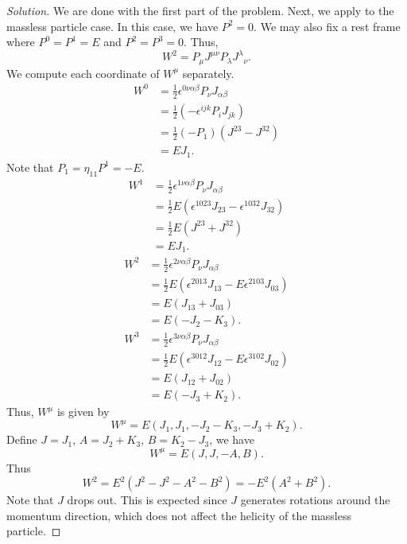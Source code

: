\begin{proof}[Solution]
	We are done with the first part of the problem. Next, we apply to the massless particle case. In this case, we have $P^2 = 0$. We may also fix a rest frame where $P^0 = P^1 = E$ and $P^2 = P^3 = 0$. Thus,
	\[
		W^2 = P_\mu J^{\mu \nu} P_\lambda {J^\lambda} _ \nu.
	\]
	We compute each coordinate of $W^\mu$ separately.
	\begin{align*}
		W^0
		&= \frac{1}{2} \epsilon^{0 \nu \alpha \beta} P_\nu J_{\alpha \beta} \\
		&= \frac{1}{2} (-\epsilon^{i j k} P_i J_{j k}) \\
		&= \frac{1}{2} (-P_1) (J^{23}- J^{32}) \\
		&= E J_1.
	\end{align*}
	Note that $P_1 = \eta_{1 1} P^1 = - E$.
	\begin{align*}
		W^1
		&= \frac{1}{2} \epsilon^{1 \nu \alpha \beta} P_\nu J_{\alpha \beta} \\
		&= \frac{1}{2} E (\epsilon^{1 0 2 3} J_{23} - \epsilon^{1 0 3 2} J_{32}) \\
		&= \frac{1}{2} E (J^{23} + J^{32}) \\
		&= E J_1.
	\end{align*}
	\begin{align*}
		W^2
		&= \frac{1}{2} \epsilon^{2 \nu \alpha \beta} P_\nu J_{\alpha \beta} \\
		&= \frac{1}{2} E (\epsilon^{2 0 1 3} J_{13} - E \epsilon^{2 1 0 3} J_{03}) \\
		&= E(J_{1 3} + J_{0 3}) \\
		&= E(- J_2 - K_3).
	\end{align*}
	\begin{align*}
		W^3
		&= \frac{1}{2} \epsilon^{3 \nu \alpha \beta} P_\nu J_{\alpha \beta} \\
		&= \frac{1}{2} E (\epsilon^{3 0 1 2} J_{12} - E \epsilon^{3 1 0 2} J_{02}) \\
		&= E(J_{1 2} + J_{0 2}) \\
		&= E(- J_3 + K_2).
	\end{align*}
	Thus, $W^\mu$ is given by
	\[
		W^\mu = E (J_1, J_1, - J_2 - K_3, - J_3 + K_2).
	\]
	Define $J = J_1$, $A = J_2 + K_3$, $B = K_2 - J_3$, we have
	\[
		W^\mu = E (J, J, - A, B).
	\]
	Thus
	\[
		W^2 = E^2 (J^2 - J^2 - A^2 - B^2) = - E^2 (A^2 + B^2).
	\]
	Note that $J$ drops out. This is expected since $J$ generates rotations around the momentum direction, which does not affect the helicity of the massless particle.
\end{proof}